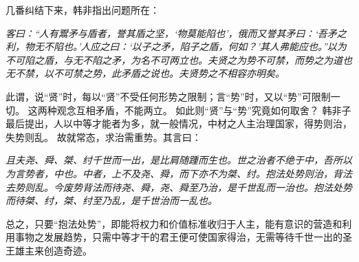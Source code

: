 \documentclass[11pt]{article}
\begin{document}
\newline

几番纠结下来，韩非指出问题所在：

\textit{客曰：“人有鬻矛与盾者，誉其盾之坚，‘物莫能陷也'，俄而又誉其矛曰：‘吾矛之利，物无不陷也。'人应之曰：‘以子之矛，陷子之盾，何如？'其人弗能应也。”以为不可陷之盾，与无不陷之矛，为名不可两立也。夫贤之为势不可禁，而势之为道也无不禁，以不可禁之势，此矛盾之说也。夫贤势之不相容亦明矣。}

此谓，说“贤”时，每以“贤”不受任何形势之限制；言“势”时，又以“势”可限制一切。
这两种观念互相矛盾，不能两立。
如此则“贤”与“势”究竟如何取舍？
韩非子最后提出，人以中等才能者为多，就一般情况，中材之人主治理国家，得势则治，失势则乱。
故就常态，求治需重势。其言曰：

\textit{且夫尧、舜、桀、纣千世而一出，是比肩随踵而生也。世之治者不绝于中，吾所以为言势者，中也。中者，上不及尧、舜，而下亦不为桀、纣。抱法处势则治，背法去势则乱。今废势背法而待尧、舜，尧、舜至乃治，是千世乱而一治也。抱法处势而待桀、纣，桀、纣至乃乱，是千世治而一乱也。}

总之，只要“抱法处势”，即能将权力和价值标准收归于人主，能有意识的营造和利用事物之发展趋势，只需中等才干的君王便可使国家得治，无需等待千世一出的圣王雄主来创造奇迹。
  
\end{document}
